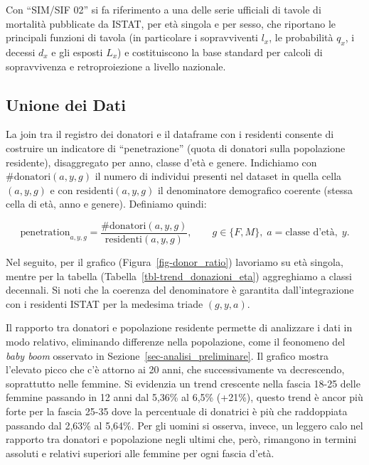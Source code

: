 \documentclass[
  italian,
  a4paper,
  a4paper,
  twoside,
  open=right,
  12pt]{scrbook}
\theoremstyle{definition}
\theoremstyle{remark}
\begin{document}
\begin{tcolorbox}[enhanced jigsaw, breakable, colframe=quarto-callout-note-color-frame, toprule=.15mm, title=\textcolor{quarto-callout-note-color}{\faInfo}\hspace{0.5em}{Nota sulle tavole SIM/SIF 02}, arc=.35mm, colback=white, bottomrule=.15mm, bottomtitle=1mm, colbacktitle=quarto-callout-note-color!10!white, toptitle=1mm, titlerule=0mm, opacityback=0, rightrule=.15mm, opacitybacktitle=0.6, leftrule=.75mm, left=2mm, coltitle=black]

Con ``SIM/SIF 02'' si fa riferimento a una delle serie ufficiali di
tavole di mortalità pubblicate da ISTAT, per età singola e per sesso,
che riportano le principali funzioni di tavola (in particolare i
sopravviventi \(l_x\), le probabilità \(q_x\), i decessi \(d_x\) e gli
esposti \(L_x\)) e costituiscono la base standard per calcoli di
sopravvivenza e retroproiezione a livello nazionale.

\end{tcolorbox}

\subsection{Unione dei Dati}\label{unione-dei-dati}

La join tra il registro dei donatori e il dataframe con i residenti
consente di costruire un indicatore di ``penetrazione'' (quota di
donatori sulla popolazione residente), disaggregato per anno, classe
d'età e genere. Indichiamo con \(\#\text{donatori}(a,y,g)\) il numero di
individui presenti nel dataset in quella cella \((a,y,g)\) e con
\(\text{residenti}(a,y,g)\) il denominatore demografico coerente (stessa
cella di età, anno e genere). Definiamo quindi:

\[
\text{penetration}_{a,y,g} = \frac{\#\text{donatori}(a,y,g)}{\text{residenti}(a,y,g)},
 \qquad g\in\{F,M\},\; a=\text{classe d’età},\; y.
\]

Nel seguito, per il grafico (Figura~\ref{fig-donor_ratio}) lavoriamo su
età singola, mentre per la tabella
(Tabella~\ref{tbl-trend_donazioni_eta}) aggreghiamo a classi decennali.
Si noti che la coerenza del denominatore è garantita dall'integrazione
con i residenti ISTAT per la medesima triade \((g,y,a)\).

Il rapporto tra donatori e popolazione residente permette di analizzare
i dati in modo relativo, eliminando differenze nella popolazione, come
il feonomeno del \emph{baby boom} osservato in
Sezione~\ref{sec-analisi_preliminare}. Il grafico mostra l'elevato picco
che c'è attorno ai 20 anni, che successivamente va decrescendo,
soprattutto nelle femmine. Si evidenzia un trend crescente nella fascia
18-25 delle femmine passando in 12 anni dal 5,36\% al 6,5\% (+21\%),
questo trend è ancor più forte per la fascia 25-35 dove la percentuale
di donatrici è più che raddoppiata passando dal 2,63\% al 5,64\%. Per
gli uomini si osserva, invece, un leggero calo nel rapporto tra donatori
e popolazione negli ultimi che, però, rimangono in termini assoluti e
relativi superiori alle femmine per ogni fascia d'età.
\end{document}
